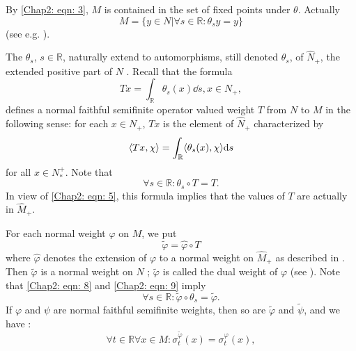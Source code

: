 By \eqref{Chap2: eqn: 3}, $M$ is contained in the set of fixed points under $\theta$. Actually
\begin{equation}\label{Chap2: eqn: 5}
    M=\{y\in N|\forall s\in \mathbb{R}:\theta_s y=y\}
\end{equation}
(see e.g. \cite[Lemma 3.6]{5}).\par
The $\theta_s$, $s\in \mathbb{R}$, naturally extend to automorphisms, still denoted $\theta_s$, of $\hat{N}_+$, the extended positive part of $N$ \cite[Section 1]{7}.
Recall \cite[Lemma 5.2]{8} that the formula
\begin{equation}\label{Chap2: eqn: 6}
    Tx=\int_{\mathbb{R}}\theta_s(x)\dd s,x\in N_+,
\end{equation}
defines a normal faithful semifinite operator valued weight $T$ from $N$ to $M$ in the following sense: for each $x\in N_+$, $Tx$ is the element of $\hat{N}_+$ characterized by
\begin{equation}
    \langle Tx,\chi\rangle=\int_\mathbb{R} \langle\theta_s(x),\chi\rangle\dd s
\end{equation}
for all $x\in N_*^+$. Note that
\begin{equation}\label{Chap2: eqn: 8}
    \forall s\in \mathbb{R}: \theta_s\circ T=T.
\end{equation}
In view of \eqref{Chap2: eqn: 5}, this formula implies that the values of $T$ are actually in $\hat{M}_+$.\par
For each normal weight $\varphi$ on $M$, we put
\begin{equation}\label{Chap2: eqn: 9}
    \tilde{\varphi}=\hat{\varphi}\circ T
\end{equation}
where $\hat{\varphi}$ denotes the extension of $\varphi$ to a normal weight on $\hat{M}_+$ as described in \cite[Proposition 1.10]{7}. Then $\tilde{\varphi}$ is a normal weight on $N$ \cite[Proposition 2.3]{7}; $\tilde{\varphi}$ is called the dual weight of $\varphi$ (see \cite[Introduction + Section 1]{6}). Note that \eqref{Chap2: eqn: 8} and \eqref{Chap2: eqn: 9} imply
\begin{equation}
    \forall s\in \mathbb{R}: \tilde{\varphi}\circ \theta_s=\tilde{\varphi}.
\end{equation}
If $\varphi$ and $\psi$ are normal faithful semifinite weights, then so are $\tilde{\varphi}$ and $\tilde{\psi}$, and we have \cite[Theorem 4.7]{7}:
\begin{equation}
    \forall t\in \mathbb{R}\forall x\in M: \sigma_t^{\tilde{\varphi}}(x)=\sigma_t^{\varphi}(x),
\end{equation}
